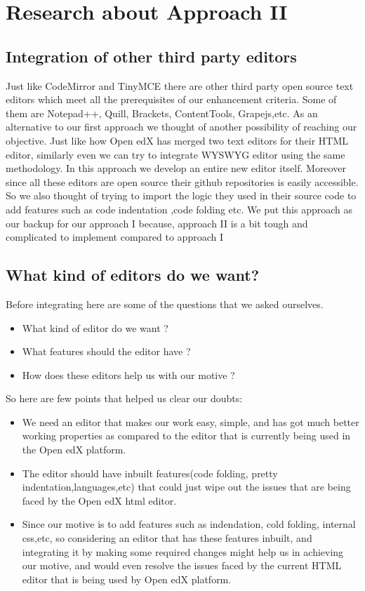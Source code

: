 \chapter{Research about Approach II}
\section{Integration of  other third party editors}
Just like CodeMirror and TinyMCE there are other third party open source text editors
which meet all the prerequisites of our enhancement criteria. Some of them are Notepad++,
Quill, Brackets, ContentTools, Grapejs,etc. As an alternative to our first approach we
thought of another possibility of reaching our objective. Just like how Open edX has
merged two text editors for their HTML editor, similarly even we can try to integrate
WYSWYG editor using the same methodology. In this approach we develop an entire new
editor itself. Moreover since all these editors are open source their github repositories is
easily accessible. So we also thought of trying to import the logic they used in their source
code to add features such as code indentation ,code folding etc. We put this approach as our
backup for our approach I because, approach II is a bit tough and complicated to implement
compared to approach I
\section{What kind of editors do we want?}  
Before integrating here are some of the questions that we asked ourselves. \newline
\begin{itemize}
\item What kind of editor do we want ?
\item What features should the editor have ?
\item How does these editors help us with our motive ? \newline 
\end{itemize}
So here are few points that helped us clear our doubts: \newline
\begin{itemize}
\item We need an editor that makes our work easy, simple, and has got much better working
properties as compared to the editor that is currently being used in the Open edX platform.
\item The editor should have inbuilt features(code folding, pretty indentation,languages,etc) that
could just wipe out the issues that are being faced by the Open edX html editor.
\item Since our motive is to add features such as indendation, cold folding, internal css,etc, so
considering an editor that has these features inbuilt, and integrating it by making some
required changes might help us in achieving our motive, and would even resolve the 
 issues faced by the current HTML editor that is being used by Open edX platform. \newline
\end{itemize}


